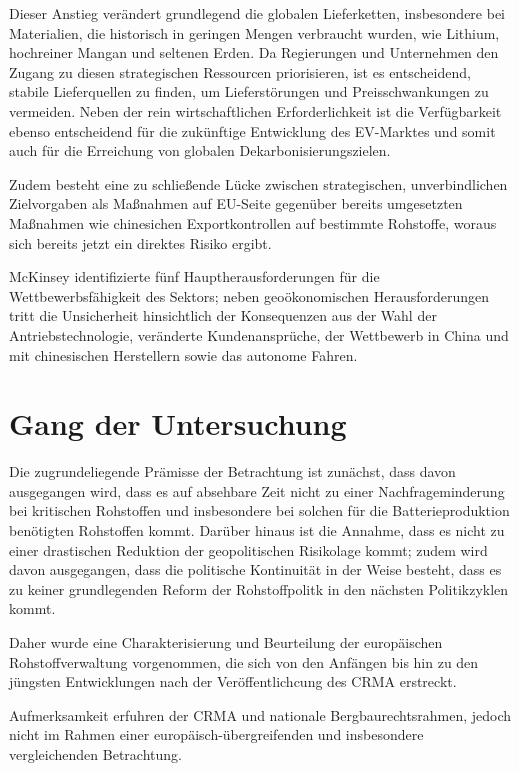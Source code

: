 \documentclass[12pt,a4paper,oneside]{book} %
\begin{document}
Dieser Anstieg verändert grundlegend die globalen Lieferketten, insbesondere bei Materialien, die historisch in geringen Mengen verbraucht wurden, wie Lithium, hochreiner Mangan und seltenen Erden. Da Regierungen und Unternehmen den Zugang zu diesen strategischen Ressourcen priorisieren, ist es entscheidend, stabile Lieferquellen zu finden, um Lieferstörungen und Preisschwankungen zu vermeiden. Neben der rein wirtschaftlichen Erforderlichkeit ist die Verfügbarkeit ebenso entscheidend für die zukünftige Entwicklung des EV-Marktes und somit auch für die Erreichung von globalen Dekarbonisierungszielen.

Zudem besteht eine zu schließende Lücke zwischen strategischen, unverbindlichen Zielvorgaben als Maßnahmen auf EU-Seite gegenüber bereits umgesetzten Maßnahmen wie chinesichen Exportkontrollen auf bestimmte Rohstoffe, woraus sich bereits jetzt ein direktes Risiko ergibt.

McKinsey identifizierte fünf Hauptherausforderungen für die Wettbewerbsfähigkeit des Sektors; neben geoökonomischen Herausforderungen tritt die Unsicherheit hinsichtlich der Konsequenzen aus der Wahl der Antriebstechnologie, veränderte Kundenansprüche, der Wettbewerb in China und mit chinesischen Herstellern sowie das autonome Fahren.\autocite{McKinsey: European automotive industry: What it takes to regain competitiveness}

\section{Gang der Untersuchung}

Die zugrundeliegende Prämisse der Betrachtung ist zunächst, dass davon ausgegangen wird, dass es auf absehbare Zeit nicht zu einer Nachfrageminderung bei kritischen Rohstoffen und insbesondere bei solchen für die Batterieproduktion benötigten Rohstoffen kommt. Darüber hinaus ist die Annahme, dass es nicht zu einer drastischen Reduktion der geopolitischen Risikolage kommt; zudem wird davon ausgegangen, dass die politische Kontinuität in der Weise besteht, dass es zu keiner grundlegenden Reform der Rohstoffpolitk in den nächsten Politikzyklen kommt.

Daher wurde eine Charakterisierung und Beurteilung der europäischen Rohstoffverwaltung vorgenommen, die sich von den Anfängen bis hin zu den jüngsten Entwicklungen nach der Veröffentlichcung des CRMA erstreckt. 

Aufmerksamkeit erfuhren der CRMA und nationale Bergbaurechtsrahmen, jedoch nicht im Rahmen einer europäisch-übergreifenden und insbesondere vergleichenden Betrachtung.
\end{document}
